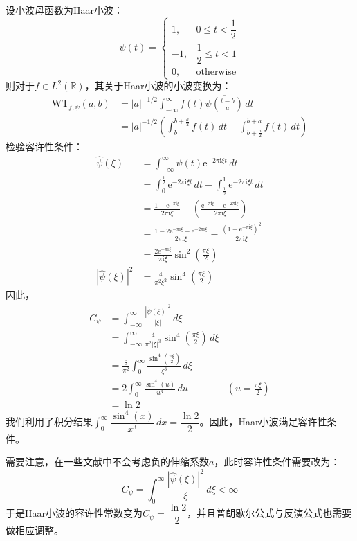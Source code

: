 \begin{example}[Haar小波]
    设小波母函数为Haar小波：
    \[\psi(t)=\begin{cases}
        1,&0\leq t<\dfrac{1}{2}\\
        -1,&\dfrac{1}{2}\leq t<1\\
        0,&\text{otherwise}
    \end{cases}\]
    则对于$f\in L^2(\mathbb{R})$，其关于Haar小波的小波变换为：
    \begin{align*}
        \mathrm{WT} _{f,\psi}(a,b)&=|a|^{-1/2}\int_{-\infty}^{\infty}f(t)\overline{\psi\left(\frac{t-b}{a}\right)}\,dt\\
        &=|a|^{-1/2}\left(\int_{b}^{b+\frac{a}{2}}f(t)\,dt-\int_{b+\frac{a}{2}}^{b+a}f(t)\,dt\right)
    \end{align*}
    检验容许性条件：
    \begin{align*}
        \hat{\psi}(\xi)&=\int_{-\infty}^{\infty}\psi(t)\mathrm{e}^{-2\pi \mathrm{i} \xi t}\,dt\\
        &=\int_{0}^{\frac{1}{2}}\mathrm{e}^{-2\pi \mathrm{i} \xi t}\,dt-\int_{\frac{1}{2}}^{1}\mathrm{e}^{-2\pi \mathrm{i} \xi t}\,dt\\
        &=\frac{1-\mathrm{e}^{-\pi \mathrm{i} \xi}}{2\pi \mathrm{i} \xi}-\left(\frac{\mathrm{e}^{-\pi \mathrm{i} \xi}-\mathrm{e}^{-2\pi \mathrm{i} \xi}}{2\pi \mathrm{i} \xi}\right)\\
        &=\frac{1-2\mathrm{e}^{-\pi \mathrm{i} \xi}+\mathrm{e}^{-2\pi \mathrm{i} \xi}}{2\pi \mathrm{i} \xi}=\frac{(1-\mathrm{e}^{-\pi \mathrm{i} \xi})^2}{2\pi \mathrm{i} \xi}\\
        &=\frac{2\mathrm{e}^{-\pi \mathrm{i}\xi}}{\pi \mathrm{i}\xi}\sin^2\left(\frac{\pi \xi}{2}\right)\\
        |\hat{\psi}(\xi)|^2&=\frac{4}{\pi^2 \xi^2}\sin^4\left(\frac{\pi \xi}{2}\right)
    \end{align*}
    因此，
    \begin{align*}
        C_{\psi}&=\int_{-\infty}^{\infty}\frac{|\hat{\psi}(\xi)|^2}{|\xi|}\,d\xi\\
        &=\int_{-\infty}^{\infty}\frac{4}{\pi^2 |\xi|^3}\sin^4\left(\frac{\pi \xi}{2}\right)\,d\xi\\
        &=\frac{8}{\pi^2}\int_{0}^{\infty}\frac{\sin^4\left(\frac{\pi \xi}{2}\right)}{\xi^3}\,d\xi\\
        &=2\int_{0}^{\infty}\frac{\sin^4(u)}{u^3}\,du&\left(u=\frac{\pi \xi}{2}\right)\\
        &=\ln 2
    \end{align*}
    我们利用了积分结果$\int_{0}^{\infty}\dfrac{\sin^4(x)}{x^3}\,dx=\dfrac{\ln 2}{2}$。因此，Haar小波满足容许性条件。
\end{example}

需要注意，在一些文献中不会考虑负的伸缩系数$a$，此时容许性条件需要改为：
\[C_{\psi}=\int_{0}^{\infty}\frac{|\hat{\psi}(\xi)|^2}{\xi}\,d\xi<\infty\]
于是Haar小波的容许性常数变为$C_{\psi}=\dfrac{\ln 2}{2}$，并且普朗歇尔公式与反演公式也需要做相应调整。
